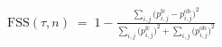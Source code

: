 \documentclass[border=10pt,varwidth=\maxdimen]{standalone}
\begin{document}
\(\displaystyle \mathrm{FSS}(\tau, n) \;=\; 1 - \frac{\sum_{i,j}\big(p^{\mathrm{fc}}_{i,j} - p^{\mathrm{ob}}_{i,j}\big)^2}{\sum_{i,j}\big(p^{\mathrm{fc}}_{i,j}\big)^2 + \sum_{i,j}\big(p^{\mathrm{ob}}_{i,j}\big)^2} \)
\end{document}
